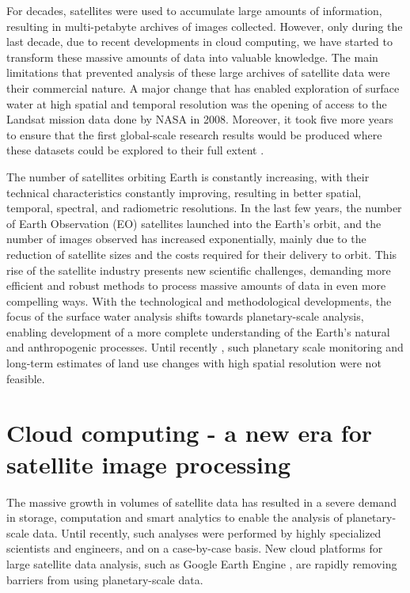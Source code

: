 For decades, satellites were used to accumulate large amounts of information, resulting in multi-petabyte archives of images collected. However, only during the last decade, due to recent developments in cloud computing, we have started to transform these massive amounts of data into valuable knowledge. The main limitations that prevented analysis of these large archives of satellite data were their commercial nature. A major change that has enabled exploration of surface water at high spatial and temporal resolution was the opening of access to the Landsat mission data done by NASA in 2008. Moreover, it took five more years to ensure that the first global-scale research results would be produced where these datasets could be explored to their full extent \citep{Hansen2013}.


The number of satellites orbiting Earth is constantly increasing, with their technical characteristics constantly improving, resulting in better spatial, temporal, spectral, and radiometric resolutions. In the last few years, the number of Earth Observation (EO) satellites launched into the Earth's orbit, and the number of images observed has increased exponentially, mainly due to the reduction of satellite sizes and the costs required for their delivery to orbit. This rise of the satellite industry presents new scientific challenges, demanding more efficient and robust methods to process massive amounts of data in even more compelling ways. With the technological and methodological developments, the focus of the surface water analysis shifts towards planetary-scale analysis, enabling development of a more complete understanding of the Earth's natural and anthropogenic processes. Until recently \citep{Hansen2013, pekel2016high}, such planetary scale monitoring and long-term estimates of land use changes with high spatial resolution were not feasible.

\section{Cloud computing - a new era for satellite image processing}

The massive growth in volumes of satellite data has resulted in a severe demand in storage, computation and smart analytics to enable the analysis of planetary-scale data. Until recently, such analyses were performed by highly specialized scientists and engineers, and on a case-by-case basis. New cloud platforms for large satellite data analysis, such as Google Earth Engine \citep{Gorelick2012}, are rapidly removing barriers from using planetary-scale data. 

